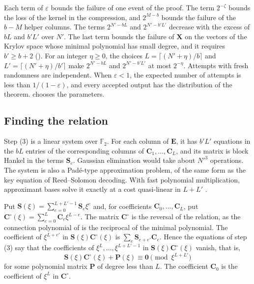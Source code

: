 \documentclass[b5paper, 10pt, abstract=true, captions=tableheading]{scrartcl}
\theoremstyle{plain}
\theoremstyle{definition}
\newcommand{\FF}{\mathds{F}}
\newcommand{\mat}[1]{\symbf{#1}}
\begin{document}
Each term of $\varepsilon$ bounds the failure of one event of the proof.
The term $2^{-\zeta}$ bounds the loss of the kernel in the compression, and
$2^{M-b}$ bounds the failure of the $b-M$ helper columns. The terms
$2^{N'-bL}$ and $2^{N'-b'L'}$ decrease with the excess of $bL$ and $b'L'$
over $N'$. The last term bounds the failure of $\mat X$ on the vectors of
the Krylov space whose minimal polynomial has small degree, and it requires
$b'\geq b+2$ (). For an integer $\eta\geq0$, the choices
$L=\lceil(N'+\eta)/b\rceil$ and $L'=\lceil(N'+\eta)/b'\rceil$ make
$2^{N'-bL}$ and $2^{N'-b'L'}$ at most $2^{-\eta}$. Attempts with fresh
randomness are independent. When $\varepsilon<1$, the expected number of
attempts is less than $1/(1-\varepsilon)$, and every accepted output has
the distribution of the theorem.  chooses the
parameters.
\subsection{Finding the relation}
\label{subsec:wiedemann-relation}
Step (3) is a linear system over $\FF_2$. For each column of $\mat E$, it
has $b'L'$ equations in the $bL$ entries of the corresponding columns of
$\mat C_1,\ldots,\mat C_L$, and its matrix is block Hankel in the terms
$\mat S_e$. Gaussian elimination would take about $N'^3$ operations. The
system is also a Pad\'e-type approximation problem, of the same form as the
key equation of Reed--Solomon decoding. With fast polynomial
multiplication, approximant bases solve it exactly at a cost quasi-linear
in $L+L'$ \cite{GiorgiJeannerodVillard2003}.

Put $\mat S(\xi)=\sum_{e=0}^{L+L'-1}\mat S_e\xi^e$ and, for coefficients
$\mat C_0,\ldots,\mat C_L$, put
$\mat C^\circ(\xi)=\sum_{e=0}^{L}\mat C_e\xi^{L-e}$. The matrix
$\mat C^\circ$ is the reversal of the relation, as the connection
polynomial of  is the reciprocal of the
minimal polynomial. The coefficient of
$\xi^{L+e'}$ in $\mat S(\xi)\mat C^\circ(\xi)$ is
$\sum_{e}\mat S_{e+e'}\mat C_e$. Hence the equations of step (3) say that
the coefficients of $\xi^L,\ldots,\xi^{L+L'-1}$ in
$\mat S(\xi)\mat C^\circ(\xi)$ vanish, that is,
\begin{equation}\label{eq:wiedemann-pade}
  \mat S(\xi)\mat C^\circ(\xi)+\mat P(\xi)\equiv\mat 0
  \pmod{\xi^{L+L'}}
\end{equation}
for some polynomial matrix $\mat P$ of degree less than $L$. The
coefficient $\mat C_0$ is the coefficient of $\xi^L$ in $\mat C^\circ$.
\end{document}

